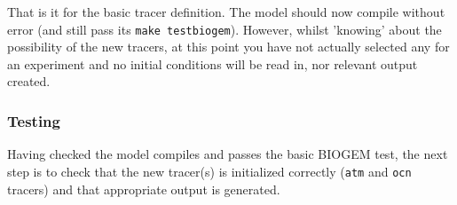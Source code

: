 \documentclass[10pt,twoside]{article}
\begin{document}
That is it for the basic tracer definition. The model should now compile without error (and still pass its \texttt{make testbiogem}). However, whilst 'knowing' about the possibility of the new tracers, at this point you have not actually selected any for an experiment and no initial conditions will be read in, nor relevant output created.


\subsubsection{Testing}

Having checked the model compiles and passes the basic BIOGEM test, the next step is to check that the new tracer(s) is initialized correctly (\texttt{atm} and \texttt{ocn} tracers) and that appropriate output is generated.
\end{document}
